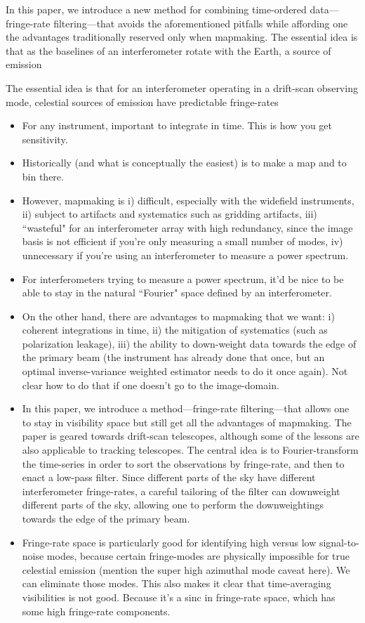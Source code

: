 \documentclass[twocolumn,apj,numberedappendix]{emulateapj}
\begin{document}
In this paper, we introduce a new method for combining time-ordered data---fringe-rate filtering---that avoids the aforementioned pitfalls while affording one the advantages traditionally reserved only when mapmaking.  The essential idea is that as the baselines of an interferometer rotate with the Earth, a source of emission 

The essential idea is that for an interferometer operating in a drift-scan observing mode, celestial sources of emission have predictable fringe-rates 

\begin{itemize}
\item For any instrument, important to integrate in time.  This is how you get sensitivity.
\item Historically (and what is conceptually the easiest) is to make a map and to bin there.
\item However, mapmaking is i) difficult, especially with the widefield instruments, ii) subject to artifacts and systematics such as gridding artifacts, iii) ``wasteful" for an interferometer array with high redundancy, since the image basis is not efficient if you're only measuring a small number of modes, iv) unnecessary if you're using an interferometer to measure a power spectrum.
\item For interferometers trying to measure a power spectrum, it'd be nice to be able to stay in the natural ``Fourier" space defined by an interferometer.
\item On the other hand, there are advantages to mapmaking that we want: i) coherent integrations in time, ii) the mitigation of systematics (such as polarization leakage), iii) the ability to down-weight data towards the edge of the primary beam (the instrument has already done that once, but an optimal inverse-variance weighted estimator needs to do it once again).  Not clear how to do that if one doesn't go to the image-domain.
\item In this paper, we introduce a method---fringe-rate filtering---that allows one to stay in visibility space but still get all the advantages of mapmaking.  The paper is geared towards drift-scan telescopes, although some of the lessons are also applicable to tracking telescopes.  The central idea is to Fourier-transform the time-series in order to sort the observations by fringe-rate, and then to enact a low-pass filter.  Since different parts of the sky have different interferometer fringe-rates, a careful tailoring of the filter can downweight different parts of the sky, allowing one to perform the downweightings towards the edge of the primary beam.
\item Fringe-rate space is particularly good for identifying high versus low signal-to-noise modes, because certain fringe-modes are physically impossible for true celestial emission (mention the super high azimuthal mode caveat here).  We can eliminate those modes.  This also makes it clear that time-averaging visibilities is not good.  Because it's a sinc in fringe-rate space, which has some high fringe-rate components.


\end{itemize}
\end{document}
